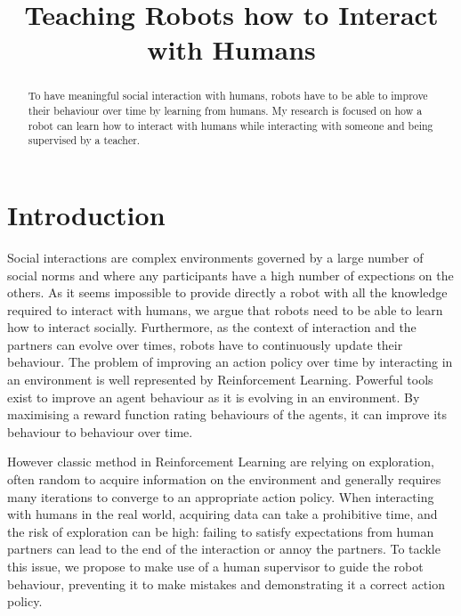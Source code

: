 \documentclass[conference]{IEEEtran}
\begin{document}
\title{Teaching Robots how to Interact with Humans}

\author{
}

\maketitle

\begin{abstract}

To have meaningful social interaction with humans, robots have to be able to improve
    their behaviour over time by learning from humans. My research is
    focused on how a robot can learn how to interact with humans while
    interacting with someone and being supervised by a teacher.

\end{abstract}

\section{Introduction}

Social interactions are complex environments governed by a large number of
social norms and where any participants have a high number of expections on the
others.  As it seems impossible to provide directly a robot with all the
knowledge required to interact with humans, we argue that robots need to be able
to learn how to interact socially. Furthermore, as the context of interaction
and the partners can evolve over times, robots have to continuously update their
behaviour.  The problem of improving an action policy over time by interacting
in an environment is well represented by Reinforcement Learning. Powerful tools
exist to improve an agent behaviour as it is evolving in an environment. By
maximising a reward function rating behaviours of the agents, it can improve its
behaviour to behaviour over time. 

However classic method in Reinforcement Learning are relying on exploration,
often random to acquire information on the environment and generally requires
many iterations to converge to an appropriate action policy. When interacting
with humans in the real world, acquiring data can take a prohibitive time, and
the risk of exploration can be high: failing to satisfy expectations from human
partners can lead to the end of the interaction or annoy the partners. To tackle
this issue, we propose to make use of a human supervisor to guide the robot
behaviour, preventing it to make mistakes and demonstrating it a correct action
policy.
\end{document}
